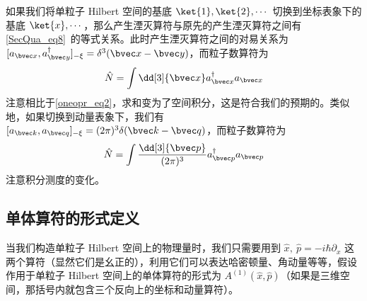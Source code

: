 如果我们将单粒子 Hilbert 空间的基底 $\ket{1},\ket{2},\cdots$ 切换到坐标表象下的基底 $\ket{x},\cdots$，那么产生湮灭算符与原先的产生湮灭算符之间有\autoref{SecQua_eq8}~的等式关系。此时产生湮灭算符之间的对易关系为 $[a_{\bvec x},a_{\bvec y}^\dagger]_{-\xi}=\delta^3(\bvec x-\bvec y)$，而粒子数算符为
\begin{equation}
\begin{aligned}
\hat N=\int \dd[3]{\bvec x} a^\dagger_{\bvec x} a_{\bvec x}
\end{aligned}
\end{equation}
注意相比于\autoref{oneopr_eq2}，求和变为了空间积分，这是符合我们的预期的。类似地，如果切换到动量表象下，我们有 $[a_{\bvec k},a_{\bvec q}]_{-\xi}= (2\pi)^3 \delta(\bvec k-\bvec q)$，而粒子数算符为
\begin{equation}
\begin{aligned}
\hat N=\int \frac{\dd[3]{\bvec p}}{(2\pi)^3} a^\dagger_{\bvec p} a_{\bvec p}
\end{aligned}
\end{equation}
注意积分测度的变化。
\subsection{单体算符的形式定义}
当我们构造单粒子 Hilbert 空间上的物理量时，我们只需要用到 $\hat x,\ \hat p=-i\hbar \partial_x$ 这两个算符（显然它们是幺正的），利用它们可以表达哈密顿量、角动量等等，假设作用于单粒子 Hilbert 空间上的单体算符的形式为 $A^{(1)}(\hat x,\hat p)$（如果是三维空间，那括号内就包含三个反向上的坐标和动量算符）。

